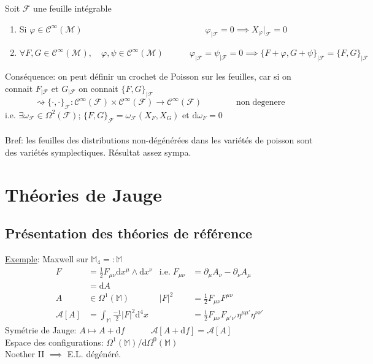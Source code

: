 \documentclass[a4paper,11pt]{article}
\renewcommand{\d}{{\mathrm{d}}}
\newcommand{\e}{{\mathrm{e}}}
\begin{document}
\noindent Soit $\mathcal{F}$ une feuille intégrable
\begin{enumerate}
\item Si $\varphi \in \mathcal{C}^\infty(\mathcal{M}) \quad\quad\quad\quad\quad\quad\quad\quad\quad\quad
\quad\quad\quad\quad\;
\varphi_{|\mathcal{F}} = 0 \implies X_\varphi |_\mathcal{F} =0$
\item $\forall F,G \in \mathcal{C}^\infty(\mathcal{M}), \quad\varphi,\psi \in \mathcal{C}^\infty(\mathcal{M}) \quad\quad\quad \varphi_{|\mathcal{F}}=\psi_{|\mathcal{F}}=0 \implies \{F+\varphi, G+\psi\}_{|\mathcal{F}} = \{F,G\}_{|\mathcal{F}}$
\end{enumerate}
Conséquence: on peut définir un crochet de Poisson sur les feuilles, car si on connait $F_{|\mathcal{F}}$ et $G_{|\mathcal{F}}$ on connait $\{F,G\}_{|\mathcal{F}}$
$$\rightsquigarrow \{\cdot,\cdot\}_{\mathcal{F}} : \mathcal{C}^\infty(\mathcal{F})\times\mathcal{C}^\infty(\mathcal{F}) \to \mathcal{C}^\infty(\mathcal{F})
\quad\quad\quad\quad
\mathrm{non}\;\mathrm{degenere}$$
i.e. $\exists \omega_\mathcal{F} \in \Omega^2(\mathcal{F})$; \quad $\{F,G\}_\mathcal{F}=\omega_\mathcal{F}(X_F,X_G)$ et $\d \omega_F = 0$\\ \\
Bref: les feuilles des distributions non-dégénérées dans les variétés de poisson sont des variétés symplectiques. Résultat assez sympa.
\section{Théories de Jauge}
\subsection{Présentation des théories de référence}
\noindent\underline{Exemple}: Maxwell sur $\mathbb{M}_4=:\mathbb{M}$
\begin{align*}
F &= \frac{1}{2}F_{\mu\nu}\d x^\mu \wedge \d x^\nu
& \mathrm{i}.\e. \; F_{\mu\nu}&= \partial_\mu A_\nu - \partial_\nu A_\mu\\
&= \d A &&\\
A &\in \Omega^1(\mathbb{M})&
|F|^2 &= \frac{1}{2}F_{\mu\nu}F^{\mu\nu}\\
\mathcal{A}[A] &= \int_\mathbb{M} \frac{-1}{2}|F|^2 \d^4x&
&=\frac{1}{2}F_{\mu\nu}F_{\mu'\nu'} \eta^{\mu\mu'}\eta^{\nu\nu'}
\end{align*}
Symétrie de Jauge: $A\mapsto A+\d f \quad\quad\quad \mathcal{A}[A+\d f] = \mathcal{A}[A]$\\
Espace des configurations: $\Omega^1(\mathbb{M}) / \d\Omega^0(\mathbb{M})$\\
Noether II $\implies$ E.L. dégénéré.\\
\end{document}
